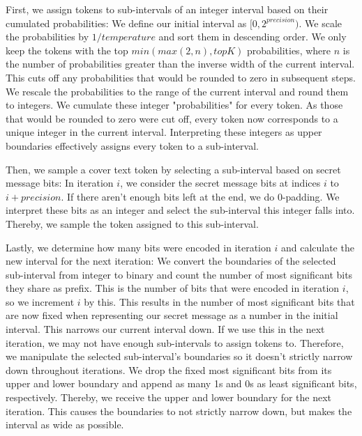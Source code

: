First, we assign tokens to sub-intervals of an integer interval based on their cumulated probabilities: We define our initial interval as $ [0, 2^{precision}) $. We scale the probabilities by $ 1/temperature $ and sort them in descending order. We only keep the tokens with the top $ min(max(2, n), topK) $ probabilities, where $ n $ is the number of probabilities greater than the inverse width of the current interval. This cuts off any probabilities that would be rounded to zero in subsequent steps. We rescale the probabilities to the range of the current interval and round them to integers. We cumulate these integer "probabilities" for every token. As those that would be rounded to zero were cut off, every token now corresponds to a unique integer in the current interval. Interpreting these integers as upper boundaries effectively assigns every token to a sub-interval.

Then, we sample a cover text token by selecting a sub-interval based on secret message bits: In iteration $ i $, we consider the secret message bits at indices $ i $ to $ i + precision $. If there aren't enough bits left at the end, we do 0-padding. We interpret these bits as an integer and select the sub-interval this integer falls into. Thereby, we sample the token assigned to this sub-interval.

Lastly, we determine how many bits were encoded in iteration $ i $ and calculate the new interval for the next iteration: We convert the boundaries of the selected sub-interval from integer to binary and count the number of most significant bits they share as prefix. This is the number of bits that were encoded in iteration $ i $, so we increment $ i $ by this. This results in the number of most significant bits that are now fixed when representing our secret message as a number in the initial interval. This narrows our current interval down. If we use this in the next iteration, we may not have enough sub-intervals to assign tokens to. Therefore, we manipulate the selected sub-interval's boundaries so it doesn't strictly narrow down throughout iterations. We drop the fixed most significant bits from its upper and lower boundary and append as many 1s and 0s as least significant bits, respectively. Thereby, we receive the upper and lower boundary for the next iteration. This causes the boundaries to not strictly narrow down, but makes the interval as wide as possible.

